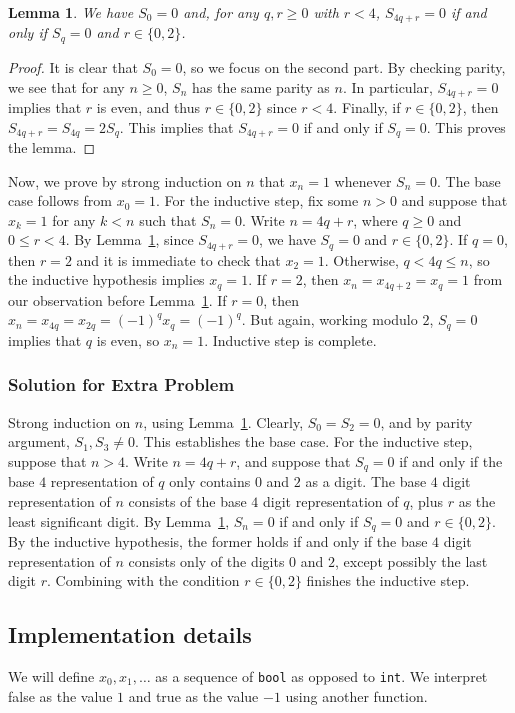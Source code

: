\documentclass{article}
\newtheorem{lemma}{Lemma}
\begin{document}
\begin{lemma}\label{2010a4-1}
We have $S_0 = 0$ and, for any $q, r \geq 0$ with $r < 4$, $S_{4q + r} = 0$ if and only if $S_q = 0$ and $r \in \{0, 2\}$.
\end{lemma}
\begin{proof}
It is clear that $S_0 = 0$, so we focus on the second part.
By checking parity, we see that for any $n \geq 0$, $S_n$ has the same parity as $n$.
In particular, $S_{4q + r} = 0$ implies that $r$ is even, and thus $r \in \{0, 2\}$ since $r < 4$.
Finally, if $r \in \{0, 2\}$, then $S_{4q + r} = S_{4q} = 2 S_q$.
This implies that $S_{4q + r} = 0$ if and only if $S_q = 0$.
This proves the lemma.
\end{proof}

Now, we prove by strong induction on $n$ that $x_n = 1$ whenever $S_n = 0$.
The base case follows from $x_0 = 1$.
For the inductive step, fix some $n > 0$ and suppose that $x_k = 1$ for any $k < n$ such that $S_n = 0$.
Write $n = 4q + r$, where $q \geq 0$ and $0 \leq r < 4$.
By Lemma~\ref{2010a4-1}, since $S_{4q + r} = 0$, we have $S_q = 0$ and $r \in \{0, 2\}$.
If $q = 0$, then $r = 2$ and it is immediate to check that $x_2 = 1$.
Otherwise, $q < 4q \leq n$, so the inductive hypothesis implies $x_q = 1$.
If $r = 2$, then $x_n = x_{4q + 2} = x_q = 1$ from our observation before Lemma~\ref{2010a4-1}.
If $r = 0$, then $x_n = x_{4q} = x_{2q} = (-1)^q x_q = (-1)^q$.
But again, working modulo $2$, $S_q = 0$ implies that $q$ is even, so $x_n = 1$.
Inductive step is complete.


\subsubsection*{Solution for Extra Problem}

Strong induction on $n$, using Lemma~\ref{2010a4-1}.
Clearly, $S_0 = S_2 = 0$, and by parity argument, $S_1, S_3 \neq 0$.
This establishes the base case.
For the inductive step, suppose that $n > 4$.
Write $n = 4q + r$, and suppose that $S_q = 0$ if and only if the base $4$ representation of $q$ only contains $0$ and $2$ as a digit.
The base $4$ digit representation of $n$ consists of the base $4$ digit representation of $q$, plus $r$ as the least significant digit.
By Lemma~\ref{2010a4-1}, $S_n = 0$ if and only if $S_q = 0$ and $r \in \{0, 2\}$.
By the inductive hypothesis, the former holds if and only if the base $4$ digit representation of $n$ consists only of the digits $0$ and $2$, except possibly the last digit $r$.
Combining with the condition $r \in \{0, 2\}$ finishes the inductive step.



\subsection*{Implementation details}

We will define $x_0, x_1, \ldots$ as a sequence of \texttt{bool} as opposed to \texttt{int}.
We interpret false as the value $1$ and true as the value $-1$ using another function.
\end{document}
